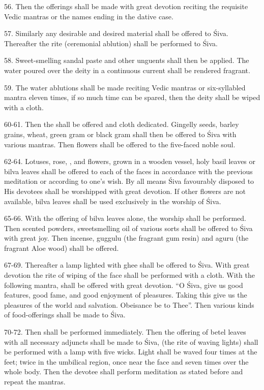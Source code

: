 56. Then the offerings shall be made with great devotion reciting the requisite
Vedic mantras or the names ending in the dative case.

57. Similarly any desirable and desired material shall be offered to Śiva.
Thereafter the  rite (ceremonial ablution) shall be performed
to Śiva.

58. Sweet-smelling sandal paste and other unguents shall then be applied.
The water poured over the deity in a continuous current shall be rendered
fragrant.

59. The water ablutions shall be made reciting Vedic mantras or six-syllabled
mantra eleven times, if so much time can be spared, then the deity shall be
wiped with a cloth.

60-61. Then the  shall be offered and cloth dedicated. Gingelly
seeds, barley grains, wheat, green gram or black gram shall then be offered to
Śiva with various mantras. Then flowers shall be offered to the five-faced noble
soul.

62-64. Lotuses, rose, , and  flowers,  grown in a wooden vessel, holy basil leaves or bilva leaves shall be
offered to each of the faces in accordance with the previous meditation or
according to one’s wish. By all means Śiva favourably disposed to His devotees
shall be worshipped with great devotion. If other flowers are not available,
bilva leaves shall be used exclusively in the worship of Śiva.

65-66. With the offering of bilva leaves alone, the worship shall be performed.
Then scented powders, sweetsmelling oil \etc of various sorts shall be offered
to Śiva with great joy. Then incense, guggulu (the fragrant gum resin) and aguru
(the fragrant Aloe wood) shall be offered.

67-69. Thereafter a lamp lighted with ghee shall be offered to Śiva. With great
devotion the rite of wiping of the face shall be performed with a cloth. With
the following mantra,  shall be offered with great devotion. “O Śiva,
give us good features, good fame, and good enjoyment of pleasures. Taking this
 give us the pleasures of the world and salvation. Obeisance be to
Thee”. Then various kinds of food-offerings shall be made to Śiva.

70-72. Then  shall be performed immediately. Then the offering of
betel leaves with all necessary adjuncts shall be made to Śiva, 
(the rite of waving lights) shall be performed with a lamp with five wicks.
Light shall be waved four times at the feet; twice in the umbilical region, once
near the face and seven times over the whole body. Then the devotee shall
perform meditation as stated before and repeat the mantras.

